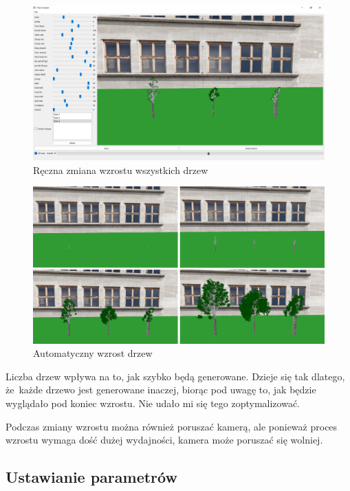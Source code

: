 \documentclass[a4paper,twoside,12pt]{report}
\begin{document}
\begin{figure}[H]
	\centering\includegraphics[width=15.5cm]{grafika/program/percentGrow.png}
	\caption{Ręczna zmiana wzrostu wszystkich drzew}
    \label{fig:percentGrow}
\end{figure}


\begin{figure}[H]
	\centering\includegraphics[width=15.5cm]{grafika/program/AllGrow.png}
	\caption{Automatyczny wzrost drzew}
    \label{fig:growAll}
\end{figure}

Liczba drzew wpływa na to, jak szybko będą generowane. 
Dzieje się tak dlatego, że~każde drzewo jest generowane inaczej, 
biorąc pod uwagę to, jak będzie wyglądało pod koniec wzrostu.
Nie udało mi się tego zoptymalizować.

Podczas zmiany wzrostu można również poruszać kamerą, 
ale ponieważ proces wzrostu wymaga dość dużej wydajności, 
kamera może poruszać się wolniej.

\subsection{Ustawianie parametrów}
\end{document}
